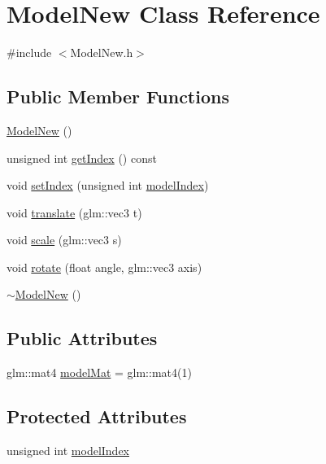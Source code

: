 \hypertarget{class_model_new}{}\section{Model\+New Class Reference}
\label{class_model_new}


{\ttfamily \#include $<$Model\+New.\+h$>$}

\subsection*{Public Member Functions}
\begin{DoxyCompactItemize}
\item 
\hyperlink{class_model_new_aca5fda36c3bdbf491d21a84ee592f2d8}{Model\+New} ()
\item 
unsigned int \hyperlink{class_model_new_a4362c70cbbdca817a5c850def86e1928}{get\+Index} () const 
\item 
void \hyperlink{class_model_new_ab45895d2ab40bd588de7349b154fc98a}{set\+Index} (unsigned int \hyperlink{class_model_new_a781a3d136368655e5accac0106785db0}{model\+Index})
\item 
void \hyperlink{class_model_new_a83696b4c03e84c85d6d556518f408c54}{translate} (glm\+::vec3 t)
\item 
void \hyperlink{class_model_new_a0cafd5c96e165656314448f4014e003a}{scale} (glm\+::vec3 s)
\item 
void \hyperlink{class_model_new_a703c8cf8ba4606aa79189b880c39c3dc}{rotate} (float angle, glm\+::vec3 axis)
\item 
\hyperlink{class_model_new_a67610903d9584e1e820c40de947d56f9}{$\sim$\+Model\+New} ()
\end{DoxyCompactItemize}
\subsection*{Public Attributes}
\begin{DoxyCompactItemize}
\item 
glm\+::mat4 \hyperlink{class_model_new_ab507d3869cd9aadb4d9b8dd00263bd01}{model\+Mat} = glm\+::mat4(1)
\end{DoxyCompactItemize}
\subsection*{Protected Attributes}
\begin{DoxyCompactItemize}
\item 
unsigned int \hyperlink{class_model_new_a781a3d136368655e5accac0106785db0}{model\+Index}
\end{DoxyCompactItemize}


